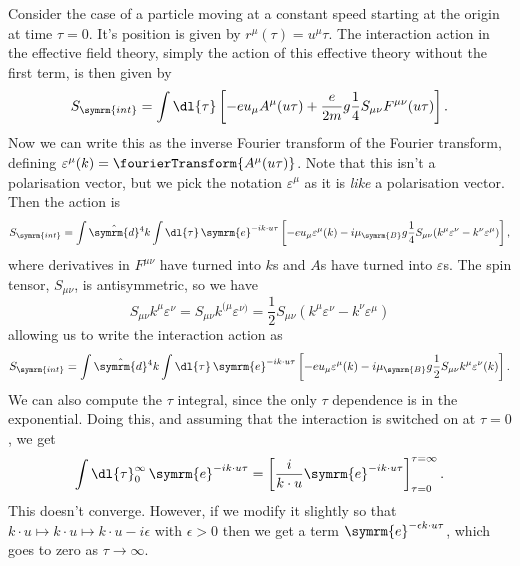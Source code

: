 \documentclass[fleqn]{NotesClass}
\newcommand{\e}{\symrm{e}}
\newcommand{\interaction}{{\symrm{int}}}
\newcommand{\dhat}[1]{\hat{\symrm{d}}{#1}}
\newcommand{\bohrMagneton}{\mu_{\symrm{B}}}
\begin{document}
    Consider the case of a particle moving at a constant speed starting at the origin at time \(\tau = 0\).
    It's position is given by \(r^\mu(\tau) = u^\mu \tau\).
    The interaction action in the effective field theory, simply the action of this effective theory without the first term, is then given by
    \begin{equation}
        S_{\interaction} = \int \dl{\tau} \left[ -e u_\mu A^\mu(u\tau) + \frac{e}{2m}g \frac{1}{4}S_{\mu\nu}F^{\mu\nu}(u\tau) \right].
    \end{equation}
    Now we can write this as the inverse Fourier transform of the Fourier transform, defining \(\varepsilon^\mu(k) = \fourierTransform\{A^\mu(u\tau)\}\).
    Note that this isn't a polarisation vector, but we pick the notation \(\varepsilon^\mu\) as it is \emph{like} a polarisation vector.
    Then the action is
    \begin{equation}
        S_{\interaction} = \int \dhat{^4k} \int \dl{\tau} \, \e^{-ik \cdot u\tau}\left[ -eu_\mu \varepsilon^\mu(k) - i\bohrMagneton g \frac{1}{4}S_{\mu\nu}(k^\mu \varepsilon^\nu - k^\nu \varepsilon^\mu) \right],
    \end{equation}
    where derivatives in \(F^{\mu\nu}\) have turned into \(k\)s and \(A\)s have turned into \(\varepsilon\)s.
    The spin tensor, \(S_{\mu\nu}\), is antisymmetric, so we have
    \begin{equation}
        S_{\mu\nu}k^\mu \varepsilon^\nu = S_{\mu\nu} k^{(\mu}\varepsilon^{\nu)} = \frac{1}{2}S_{\mu\nu}(k^\mu \varepsilon^\nu - k^\nu \varepsilon^\mu)
    \end{equation}
    allowing us to write the interaction action as
    \begin{equation}
        S_{\interaction} = \int\dhat{^4k} \int \dl{\tau} \, \e^{-ik\cdot u \tau}\left[ -e u_\mu \varepsilon^\mu(k) - i \bohrMagneton g \frac{1}{2}S_{\mu\nu}k^\mu \varepsilon^\nu(k) \right].
    \end{equation}
    We can also compute the \(\tau\) integral, since the only \(\tau\) dependence is in the exponential.
    Doing this, and assuming that the interaction is switched on at \(\tau = 0\), we get
    \begin{equation}
        \int \dl{\tau}_{0}^{\infty} \, \e^{-ik \cdot u \tau} = \left[ \frac{i}{k \cdot u} \e^{-ik \cdot u\tau} \right]_{\tau = 0}^{\tau = \infty}.
    \end{equation}
    This doesn't converge.
    However, if we modify it slightly so that \(k \cdot u \mapsto k \cdot u \mapsto k \cdot u - i\epsilon\) with \(\epsilon > 0\) then we get a term \(\e^{-\epsilon k \cdot u \tau}\), which goes to zero as \(\tau \to \infty\).
\end{document}

